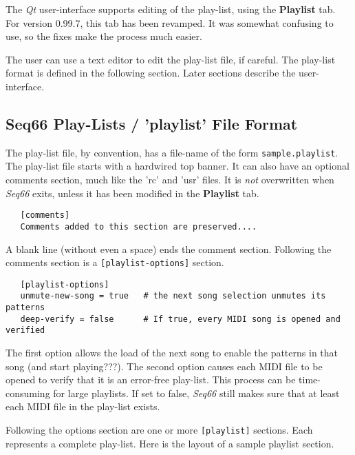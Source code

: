 
   The \textsl{Qt} user-interface supports editing of the play-list, using
   the \textbf{Playlist} tab.
   For version 0.99.7, this tab has been revamped.
   It was somewhat confusing to use, so the fixes make the
   process much easier.

   The user can use a text editor to edit the play-list file, if careful.
   The play-list format is defined in the following section.
   Later sections describe the user-interface.

\subsection{Seq66 Play-Lists / 'playlist' File Format}
\label{subsec:playlist_setup}

   The play-list file, by convention, has a file-name of the form
   \texttt{sample.playlist}.
   The play-list file starts with a hardwired top banner.
   It can also have an optional comments section, much
   like the 'rc' and 'usr' files.
   It is \textsl{not} overwritten when \textsl{Seq66} exits, unless it
   has been modified in the \textbf{Playlist} tab.

   \begin{verbatim}
   [comments]
   Comments added to this section are preserved....
   \end{verbatim}

   A blank line (without even a space) ends the comment section.
   Following the comments section is a \texttt{[playlist-options]} section.

   \begin{verbatim}
   [playlist-options]
   unmute-new-song = true   # the next song selection unmutes its patterns
   deep-verify = false      # If true, every MIDI song is opened and verified
   \end{verbatim}

   The first option allows the load of the next song to enable the patterns in
   that song (and start playing???).
   The second option causes each MIDI file to be opened to verify that it is an
   error-free play-list.  This process can be time-consuming for large
   playlists.  If set to false, \textsl{Seq66} still makes sure that
   at least each MIDI file in the play-list exists.

   Following the options section are one or more \texttt{[playlist]} sections.
   Each represents a complete play-list.
   Here is the layout of a sample playlist section.


